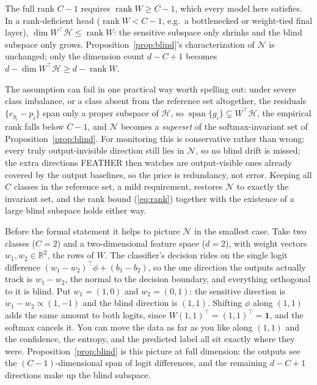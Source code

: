 \documentclass[graybox]{SNmult}
\newcommand{\R}{\mathbb{R}}
\newcommand{\act}{\phi}
\DeclareMathOperator{\rank}{rank}
\DeclareMathOperator{\spn}{span}
\begin{document}
The full rank $C-1$ requires $\rank W \ge C-1$, which every model here
satisfies. In a rank-deficient head ($\rank W < C-1$, e.g.\ a bottlenecked
or weight-tied final layer), $\dim W^\top\!\mathcal{H} \le \rank W$: the
sensitive subspace only shrinks and the blind subspace only grows.
Proposition~\ref{prop:blind}'s characterization of $\mathcal{N}$ is
unchanged; only the dimension count $d - C + 1$ becomes
$d - \dim W^\top\!\mathcal{H} \ge d - \rank W$.

The assumption can fail in one practical way worth spelling out: under severe
class imbalance, or a class absent from the reference set altogether, the
residuals $\{e_{y_i} - p_i\}$ span only a proper subspace of $\mathcal{H}$, so
$\spn\{g_i\} \subsetneq W^\top\!\mathcal{H}$, the empirical rank falls below
$C-1$, and $\mathcal{N}$ becomes a \emph{superset} of the softmax-invariant set
of Proposition~\ref{prop:blind}. For monitoring this is conservative rather than
wrong: every truly output-invisible direction still lies in $\mathcal{N}$, so no
blind drift is missed; the extra directions FEATHER then watches are
output-visible ones already covered by the output baselines, so the price is
redundancy, not error. Keeping all $C$ classes in the reference set, a mild
requirement, restores $\mathcal{N}$ to exactly the invariant set, and the rank
bound (\ref{eq:rank}) together with the existence of a large blind subspace
holds either way.

Before the formal statement it helps to picture $\mathcal{N}$ in the smallest
case. Take two classes ($C = 2$) and a two-dimensional feature space
($d = 2$), with weight vectors $w_1, w_2 \in \R^2$, the rows of $W$. The
classifier's decision rides on the single logit difference
$(w_1 - w_2)^\top\act + (b_1 - b_2)$, so the one direction the outputs
actually track is $w_1 - w_2$, the normal to the decision boundary, and
everything orthogonal to it is blind. Put $w_1 = (1,0)$ and $w_2 = (0,1)$: the
sensitive direction is $w_1 - w_2 \propto (1,-1)$ and the blind direction is
$(1,1)$. Shifting $\act$ along $(1,1)$ adds the same amount to both logits,
since $W(1,1)^\top = (1,1)^\top = \mathbf{1}$, and the softmax cancels it. You
can move the data as far as you like along $(1,1)$ and the confidence, the
entropy, and the predicted label all sit exactly where they were.
Proposition~\ref{prop:blind} is this picture at full dimension: the outputs
see the $(C-1)$-dimensional span of logit differences, and the remaining
$d - C + 1$ directions make up the blind subspace.
\end{document}
